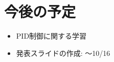 \documentclass[a4j]{ujarticle}
\begin{document}
\clearpage
\section{今後の予定}
  \begin{itemize}
    \item PID制御に関する学習
    \item 発表スライドの作成: 〜10/16
  \end{itemize}
%
% 
% 
\end{document}
